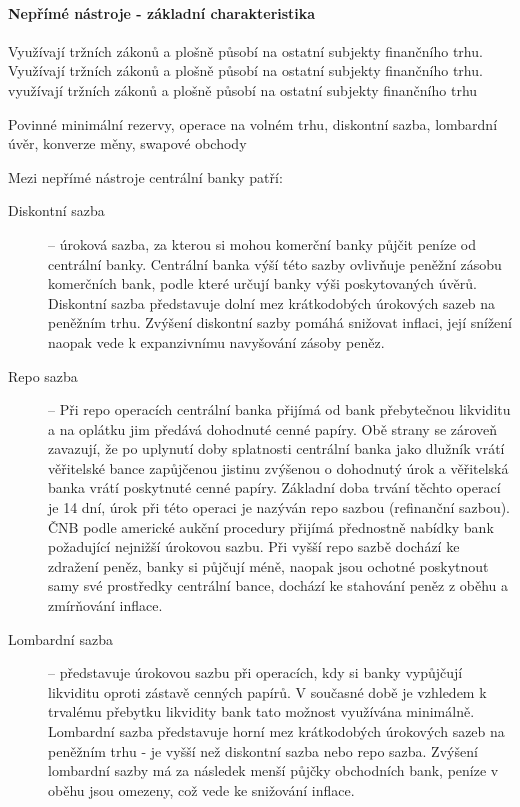 \paragraph{Nepřímé nástroje - základní charakteristika}

Využívají tržních zákonů a plošně působí na ostatní subjekty finančního trhu. Využívají tržních zákonů a plošně působí na ostatní subjekty finančního trhu. využívají tržních zákonů a plošně působí na ostatní subjekty finančního trhu

Povinné minimální rezervy, operace na volném trhu, diskontní sazba, lombardní úvěr, konverze měny, swapové obchody

Mezi nepřímé nástroje centrální banky patří:
\begin{description}
    \item[Diskontní sazba] -- úroková sazba, za kterou si mohou komerční banky půjčit peníze od centrální banky. Centrální banka výší této sazby ovlivňuje peněžní zásobu komerčních bank, podle které určují banky výši poskytovaných úvěrů. Diskontní sazba představuje dolní mez krátkodobých úrokových sazeb na peněžním trhu. Zvýšení diskontní sazby pomáhá snižovat inflaci, její snížení naopak vede k expanzivnímu navyšování zásoby peněz.
    \item[Repo sazba] -- Při repo operacích centrální banka přijímá od bank přebytečnou likviditu a na oplátku jim předává dohodnuté cenné papíry. Obě strany se zároveň zavazují, že po uplynutí doby splatnosti centrální banka jako dlužník vrátí věřitelské bance zapůjčenou jistinu zvýšenou o dohodnutý úrok a věřitelská banka vrátí poskytnuté cenné papíry. Základní doba trvání těchto operací je 14 dní, úrok při této operaci je nazýván repo sazbou (refinanční sazbou). ČNB podle americké aukční procedury přijímá přednostně nabídky bank požadující nejnižší úrokovou sazbu. Při vyšší repo sazbě dochází ke zdražení peněz, banky si půjčují méně, naopak jsou ochotné poskytnout samy své prostředky centrální bance, dochází ke stahování peněz z oběhu a zmírňování inflace.
    \item[Lombardní sazba] -- představuje úrokovou sazbu při operacích, kdy si banky vypůjčují likviditu oproti zástavě cenných papírů. V současné době je vzhledem k trvalému přebytku likvidity bank tato možnost využívána minimálně. Lombardní sazba představuje horní mez krátkodobých úrokových sazeb na peněžním trhu - je vyšší než diskontní sazba nebo repo sazba. Zvýšení lombardní sazby má za následek menší půjčky obchodních bank, peníze v oběhu jsou omezeny, což vede ke snižování inflace.

\end{description}
